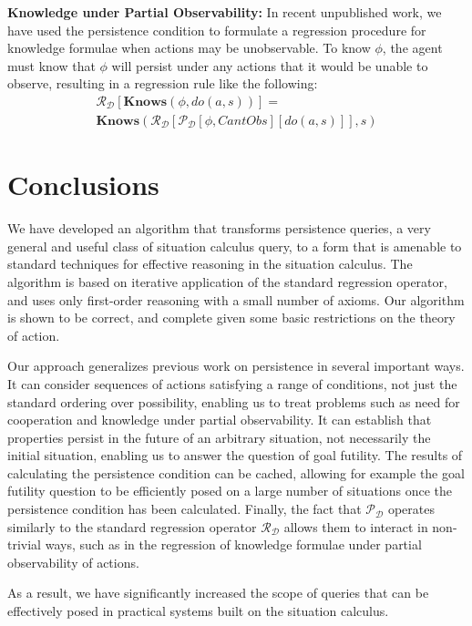 \textbf{Knowledge under Partial Observability:} In recent unpublished
work, we have used the persistence condition to formulate a regression
procedure for knowledge formulae when actions may be unobservable.
To know $\phi$, the agent must know that $\phi$ will persist under
any actions that it would be unable to observe, resulting in a regression
rule like the following:\begin{multline*}
\mathcal{R}_{\mathcal{D}}[\mathbf{Knows}(\phi,do(a,s))]=\\
\mathbf{Knows}(\mathcal{R}_{\mathcal{D}}[\mathcal{P}_{\mathcal{D}}[\phi,CantObs][do(a,s)]],s)\end{multline*}



\section{Conclusions}

We have developed an algorithm that transforms persistence queries,
a very general and useful class of situation calculus query, to a
form that is amenable to standard techniques for effective reasoning
in the situation calculus. The algorithm is based on iterative application
of the standard regression operator, and uses only first-order reasoning
with a small number of axioms. Our algorithm is shown to be correct,
and complete given some basic restrictions on the theory of action.

Our approach generalizes previous work on persistence in several important
ways. It can consider sequences of actions satisfying a range of conditions,
not just the standard ordering over possibility, enabling us to treat
problems such as need for cooperation and knowledge under partial
observability. It can establish that properties persist in the future
of an arbitrary situation, not necessarily the initial situation,
enabling us to answer the question of goal futility. The results of
calculating the persistence condition can be cached, allowing for
example the goal futility question to be efficiently posed on a large
number of situations once the persistence condition has been calculated.
Finally, the fact that $\mathcal{P_{D}}$ operates similarly to the
standard regression operator $\mathcal{R}_{\mathcal{D}}$ allows them
to interact in non-trivial ways, such as in the regression of knowledge
formulae under partial observability of actions.

As a result, we have significantly increased the scope of queries
that can be effectively posed in practical systems built on the situation
calculus.

